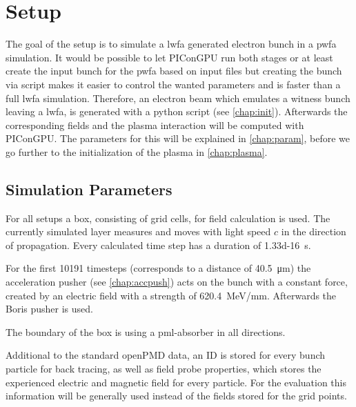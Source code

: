 \documentclass[bachelor_thesis]{subfiles}
\begin{document}
\chapter{Setup}
The goal of the setup is to simulate a \gls{lwfa} generated electron bunch in a \gls{pwfa} simulation. It would be possible to let PIConGPU run both stages or at least create the input bunch for the \gls{pwfa} based on input files
but creating the bunch via script makes it easier to control the wanted parameters and is faster than a full \gls{lwfa} simulation. Therefore, an electron beam which emulates a witness bunch leaving a \gls{lwfa}, is generated with a python script (see \autoref{chap:init}).
Afterwards the corresponding fields and the plasma interaction will be computed with PIConGPU. The parameters for this will  be explained in \autoref{chap:param}, before we go further to the initialization of the plasma in \autoref{chap:plasma}.


\section{Simulation Parameters}\label{chap:param}
For all setups a box, consisting of  grid cells, for field calculation is used. The currently simulated layer measures  and moves with light speed $c$ in the direction of propagation.
Every calculated time step has a duration of \qty{1.33d-16}{\s}. 

For the first \num{10191} timesteps (corresponds to a distance of \qty{40.5}{\um}) the acceleration pusher (see \autoref{chap:accpush}) acts on the bunch with a constant force, 
created by an electric field with a strength of \qty{620.4}{\MeV/\mm}. Afterwards the Boris pusher is used. 

The boundary of the box is using a \gls{pml}-absorber in all directions. 

Additional to the standard openPMD data, an ID is stored for every bunch particle for back tracing, as well as field probe properties, which stores the experienced electric and magnetic field for every particle. 
For the evaluation this information will be generally used instead of the fields stored for the grid points.
\end{document}
